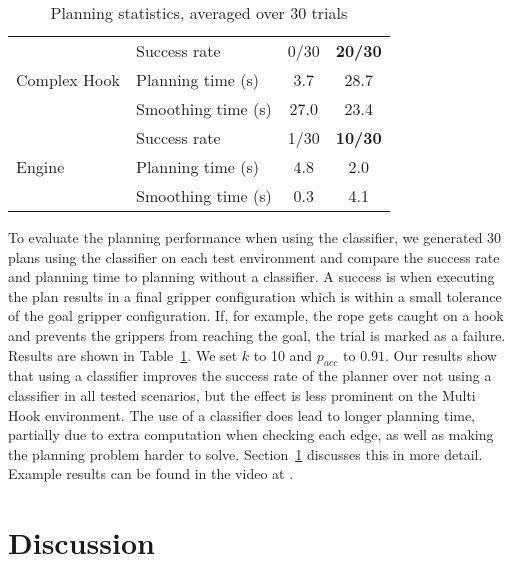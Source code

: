 \begin{table}[h]
\begin{center}
\begin{tabular}{|l|l|c|c|}
\hline
\multirow{3}{*}{Complex Hook}               & Success rate          & 0/30  & \textbf{20/30} \\
                                            & Planning time (s)     &  3.7  & 28.7 \\
                                            & Smoothing time (s)    & 27.0  & 23.4 \\
\hline
\multirow{3}{*}{Engine}                     & Success rate          & 1/30  & \textbf{10/30} \\
                                            & Planning time (s)     & 4.8   & 2.0 \\
                                            & Smoothing time (s)    & 0.3   & 4.1 \\
\hline
\end{tabular}
\end{center}
\caption{Planning statistics, averaged over 30  trials}
\label{tab:planning_stats}
\end{table}

To evaluate the planning performance when using the classifier, we generated 30 plans using the classifier on each test environment and compare the success rate and planning time to planning without a classifier. A success is when executing the plan results in a final gripper configuration which is within a small tolerance of the goal gripper configuration. If, for example, the rope gets caught on a hook and prevents the grippers from reaching the goal, the trial is marked as a failure. Results are shown in Table~\ref{tab:planning_stats}. We set $k$ to 10 and $p_{acc}$ to $0.91$. Our results show that using a classifier improves the success rate of the planner over not using a classifier in all tested scenarios, but the effect is less prominent on the Multi Hook environment. The use of a classifier does lead to longer planning time, partially due to extra computation when checking each edge, as well as making the planning problem harder to solve. Section~\ref{sec:ral_discussion} discusses this in more detail. Example results can be found in the video at \ralurl.



\section{Discussion}
\label{sec:ral_discussion}

